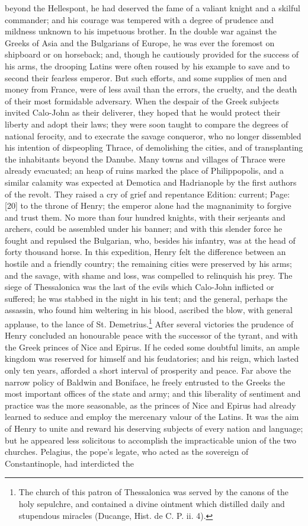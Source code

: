 beyond the Hellespont, he had deserved the fame of a valiant knight and a skilful commander; and his courage was tempered with a degree of prudence and mildness unknown to his impetuous brother. In the double war against the Greeks of Asia and the Bulgarians of Europe, he was ever the foremost on shipboard or on horseback; and, though he cautiously provided for the success of his arms, the drooping Latins were often roused by his example to save and to second their fearless emperor. But such efforts, and some supplies of men and money from France, were of less avail than the errors, the cruelty, and the death of their most formidable adversary. When the despair of the Greek subjects invited Calo-John as their deliverer, they hoped that he would protect their liberty and adopt their laws; they were soon taught to compare the degrees of national ferocity, and to execrate the savage conqueror, who no longer dissembled his intention of dispeopling Thrace, of demolishing the cities, and of transplanting the inhabitants beyond the Danube. Many towns and villages of Thrace were already evacuated; an heap of ruins marked the place of Philippopolis, and a similar calamity was expected at Demotica and Hadrianople by the first authors of the revolt. They raised a cry of grief and repentance Edition: current; Page: [20] to the throne of Henry; the emperor alone had the magnanimity to forgive and trust them. No more than four hundred knights, with their serjeants and archers, could be assembled under his banner; and with this slender force he fought and repulsed the Bulgarian, who, besides his infantry, was at the head of forty thousand horse. In this expedition, Henry felt the difference between an hostile and a friendly country; the remaining cities were preserved by his arms; and the savage, with shame and loss, was compelled to relinquish his prey. The siege of Thessalonica was the last of the evils which Calo-John inflicted or suffered; he was stabbed in the night in his tent; and the general, perhaps the assassin, who found him weltering in his blood, ascribed the blow, with general applause, to the lance of St. Demetrius.\footnote{The church of this patron of Thessalonica was served by the canons of the holy sepulchre, and contained a divine ointment which distilled daily and stupendous miracles (Ducange, Hist. de C. P. ii. 4).} After several victories the prudence of Henry concluded an honourable peace with the successor of the tyrant, and with the Greek princes of Nice and Epirus. If he ceded some doubtful limits, an ample kingdom was reserved for himself and his feudatories; and his reign, which lasted only ten years, afforded a short interval of prosperity and peace. Far above the narrow policy of Baldwin and Boniface, he freely entrusted to the Greeks the most important offices of the state and army; and this liberality of sentiment and practice was the more seasonable, as the princes of Nice and Epirus had already learned to seduce and employ the mercenary valour of the Latins. It was the aim of Henry to unite and reward his deserving subjects of every nation and language; but he appeared less solicitous to accomplish the impracticable union of the two churches. Pelagius, the pope\texthebrew{}’s legate, who acted as the sovereign of Constantinople, had interdicted the 